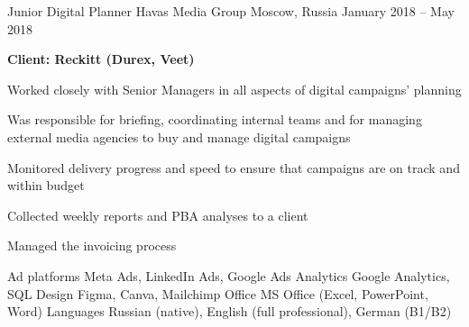 \documentclass[11pt, a4paper]{awesome-cv}
\begin{document}
\begin{cventries}
\cventry
	{Junior Digital Planner}
	{Havas Media Group}
	{Moscow, Russia}
	{January 2018 -- May 2018}
	{
		\begin{cvitems}
			\item[] {\bf Client: Reckitt (Durex, Veet)}
			\item {Worked closely with Senior Managers in all aspects of digital campaigns’ planning}
			\item {Was responsible for briefing, coordinating internal teams and for managing external media agencies to buy and manage digital campaigns}
			\item {Monitored delivery progress and speed to ensure that campaigns are on track and within budget}
			\item {Collected weekly reports and PBA analyses to a client}
			\item {Managed the invoicing process}
		\end{cvitems}
	}

\end{cventries}

\begin{cvskills}
	\cvskill
		{Ad platforms}
		{Meta Ads, LinkedIn Ads, Google Ads}
	\cvskill
		{Analytics}
		{Google Analytics, SQL}
	\cvskill
		{Design}
		{Figma, Canva, Mailchimp}
	\cvskill
		{Office}
		{MS Office (Excel, PowerPoint, Word)}
	\cvskill
		{Languages}
		{Russian (native), English (full professional), German (B1/B2)}
\end{cvskills}
\end{document}
